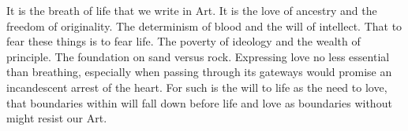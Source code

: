 

It is the breath of life that we write in Art.  It is the love of
ancestry and the freedom of originality.  The determinism of blood and
the will of intellect.  That to fear these things is to fear life.
The poverty of ideology and the wealth of principle.  The foundation
on sand versus rock.  Expressing love no less essential than
breathing, especially when passing through its gateways would promise
an incandescent arrest of the heart.  For such is the will to life as
the need to love, that boundaries within will fall down before life
and love as boundaries without might resist our Art.

\bye
